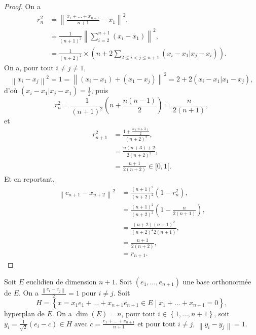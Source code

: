 \documentclass[12pt]{article}
\begin{document}
\begin{proof}
	On a 
	\begin{align}
		r_n^{2}
		&=\left\lVert \frac{x_1+\dots+x_{n+1}}{n+1}-x_1\right\rVert^{2},\\
		&=\frac{1}{(n+1)^{2}}\left\lVert\sum_{i=2}^{n+1}(x_{i}-x_1)\right\rVert^{2},\\
		&=\frac{1}{(n+2)^{2}}\times\left(n+2\sum_{2\leqslant i<j\leqslant n+1}(x_i-x_1|x_j-x_i)\right).
	\end{align}
	On a, pour tout $i\neq j\neq 1$, 
	\begin{equation}
		\left\lVert x_i-x_j\right\rVert^{2}=1=\left\lVert (x_i-x_1)+(x_1-x_j)\right\rVert^{2}=2+2(x_i-x_1|x_1-x_j),
	\end{equation}
	d'où $(x_i-x_1|x_j-x_1)=\frac{1}{2}$, puis 
	\begin{equation}
		r_n^{2}=\frac{1}{(n+1)^{2}}\left(n+\frac{n(n-1)}{2}\right)=\frac{n}{2(n+1)},
	\end{equation}
	et
	\begin{align}
		r_{n+1}^{2}
		&=\frac{1+\frac{n(n+3)}{2}}{(n+2)^{2}},\\
		&=\frac{n(n+3)+2}{2(n+2)^{2}},\\
		&=\frac{n+1}{2(n+2)}\in[0,1[.
	\end{align}
	Et en reportant, 
	\begin{align}
		\left\lVert c_{n+1}-x_{n+2}\right\rVert^{2}
		&=\frac{(n+1)^{2}}{(n+2)^{2}}(1-r_n^{2}),\\
		&=\frac{(n+1)^{2}}{(n+2)^{2}}(1-\frac{n}{2(n+1)}),\\
		&=\frac{(n+2)(n+1)^{2}}{(n+2)^{2}2(n+1)},\\
		&=\frac{n+1}{2(n+2)},\\
		&=r_{n+1}.
	\end{align}
\end{proof}

\begin{remark}
	Soit $E$ euclidien de dimension $n+1$. Soit $(e_1,\dots,e_{n+1})$ une base orthonormée de $E$. On a $\frac{\left\lVert e_i-e_j\right\rVert}{2}=1$ pour $i\neq j$. Soit 
	\begin{equation}
		H=\left\lbrace x=x_1 e_1+\dots+x_{n+1}e_{n+1}\in E\middle| x_{1}+\dots+x_{n+1}=0\right\rbrace,	
	\end{equation} 
	hyperplan de $E$. On a $\dim(E)=n$, pour tout $i\in\left\lbrace1,\dots,n+1\right\rbrace$, soit $y_i=\frac{1}{\sqrt{2}}\left(e_i-c\right)\in H$ avec $c=\frac{e_1+\dots+e_{n+1}}{n+1}$ et pour tout $i\neq j$, $\left\lVert y_i-y_j\right\rVert=1$.
\end{remark}
\end{document}
